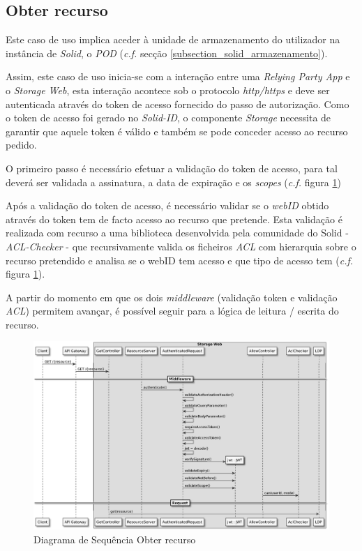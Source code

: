 \subsection{Obter recurso}
Este caso de uso implica aceder à unidade de armazenamento do utilizador na instância de \emph{Solid}, o \emph{\acrshort{POD}} (\emph{c.f.} secção \ref{subsection_solid_armazenamento}). 

Assim, este caso de uso inicia-se com a interação entre uma \emph{Relying Party App} e o \emph{Storage Web}, esta interação acontece sob o protocolo \emph{http/https} e deve ser autenticada através do token de acesso fornecido do passo de autorização.
Como o token de acesso foi gerado no \emph{Solid-ID}, o componente \emph{Storage} necessita de garantir que aquele token é válido e também se pode conceder acesso ao recurso pedido.

O primeiro passo é necessário efetuar a validação do token de acesso, para tal deverá ser validada a assinatura, a data de expiração e os \emph{scopes} (\emph{c.f.} figura \ref{retrieve_resource_sd})

Após a validação do token de acesso, é necessário validar se o \emph{webID} obtido através do token tem de facto acesso ao recurso que pretende. Esta validação é realizada com recurso a uma biblioteca desenvolvida pela comunidade do Solid - \emph{ACL-Checker} - que recursivamente valida os ficheiros \emph{\acrshort{ACL}} com hierarquia sobre o recurso pretendido e analisa se o webID tem acesso e que tipo de acesso tem (\emph{c.f.} figura \ref{retrieve_resource_sd}).

A partir do momento em que os dois \emph{middleware} (validação token e validação \emph{\acrshort{ACL}}) permitem avançar, é possível seguir para a lógica de leitura / escrita do recurso.

\begin{figure}[H]
    \begin{center}
    \includegraphics[width=1 \textwidth]{figures/retrieve_resource_sd_complete.eps}
    \caption{Diagrama de Sequência Obter recurso}
            \label{retrieve_resource_sd}
    \end{center}
\end{figure}

